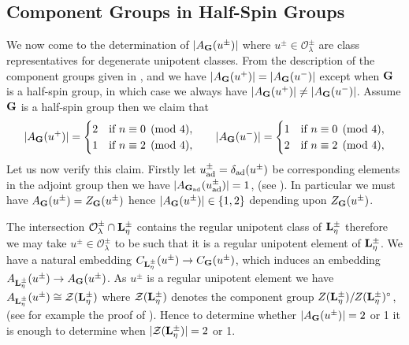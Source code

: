 \documentclass[eqthmnum]{jt-calcs}
\begin{document}
\subsection{Component Groups in Half-Spin Groups}
\begin{pa}
We now come to the determination of $|A_{\mathbf{G}}(u^{\pm})|$ where $u^{\pm} \in \mathcal{O}_{\lambda}^{\pm}$ are class representatives for degenerate unipotent classes. From the description of the component groups given in \cite[\S14.3]{lusztig:1984:intersection-cohomology-complexes}, \cite[\S10.6]{lusztig:1984:intersection-cohomology-complexes} and \cite[\S13.1]{carter:1993:finite-groups-of-lie-type} we have $|A_{\mathbf{G}}(u^+)| = |A_{\mathbf{G}}(u^-)|$ except when $\mathbf{G}$ is a half-spin group, in which case we always have $|A_{\mathbf{G}}(u^+)| \neq |A_{\mathbf{G}}(u^-)|$. Assume $\mathbf{G}$ is a half-spin group then we claim that
\begin{equation*}
\begin{gathered}
|A_{\mathbf{G}}(u^+)| = \begin{cases}
2 &\text{if }n\equiv0\pmod{4},\\
1 &\text{if }n\equiv2\pmod{4},
\end{cases}
\end{gathered}
\qquad
\begin{gathered}
|A_{\mathbf{G}}(u^-)| = \begin{cases}
1 &\text{if }n\equiv0\pmod{4},\\
2 &\text{if }n\equiv2\pmod{4},
\end{cases}
\end{gathered}
\end{equation*}
Let us now verify this claim. Firstly let $u_{\operatorname{ad}}^{\pm} = \delta_{\operatorname{ad}}(u^{\pm})$ be corresponding elements in the adjoint group then we have $|A_{\mathbf{G}_{\operatorname{ad}}}(u_{\operatorname{ad}}^{\pm})| = 1$, (see \cite[\S13.1]{carter:1993:finite-groups-of-lie-type}). In particular we must have $A_{\mathbf{G}}(u^{\pm}) = Z_{\mathbf{G}}(u^{\pm})$ hence $|A_{\mathbf{G}}(u^{\pm})| \in \{1,2\}$ depending upon $Z_{\mathbf{G}}(u^{\pm})$.

The intersection $\mathcal{O}_{\lambda}^{\pm} \cap \mathbf{L}_{\eta}^{\pm}$ contains the regular unipotent class of $\mathbf{L}_{\eta}^{\pm}$ therefore we may take $u^{\pm} \in \mathcal{O}_{\lambda}^{\pm}$ to be such that it is a regular unipotent element of $\mathbf{L}_{\eta}^{\pm}$. We have a natural embedding $C_{\mathbf{L}_{\eta}^{\pm}}(u^{\pm}) \to C_{\mathbf{G}}(u^{\pm})$, which induces an embedding $A_{\mathbf{L}_{\eta}^{\pm}}(u^{\pm}) \to A_{\mathbf{G}}(u^{\pm})$. As $u^{\pm}$ is a regular unipotent element we have $A_{\mathbf{L}_{\eta}^{\pm}}(u^{\pm}) \cong \mathcal{Z}(\mathbf{L}_{\eta}^{\pm})$ where $\mathcal{Z}(\mathbf{L}_{\eta}^{\pm})$ denotes the component group $Z(\mathbf{L}_{\eta}^{\pm})/Z(\mathbf{L}_{\eta}^{\pm})^{\circ}$, (see for example the proof of \cite[Proposition 14.24]{digne-michel:1991:representations-of-finite-groups-of-lie-type}). Hence to determine whether $|A_{\mathbf{G}}(u^{\pm})| = 2$ or 1 it is enough to determine when $|\mathcal{Z}(\mathbf{L}_{\eta}^{\pm})| = 2$ or 1.


\end{pa}
\end{document}
